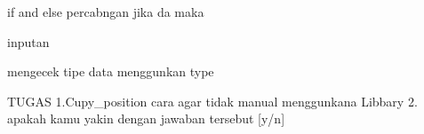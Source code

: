 if and else
percabngan jika da maka

inputan

mengecek tipe data menggunkan type

TUGAS
1.Cupy_position  cara agar tidak manual menggunkana Libbary
2. apakah kamu yakin dengan jawaban tersebut [y/n]